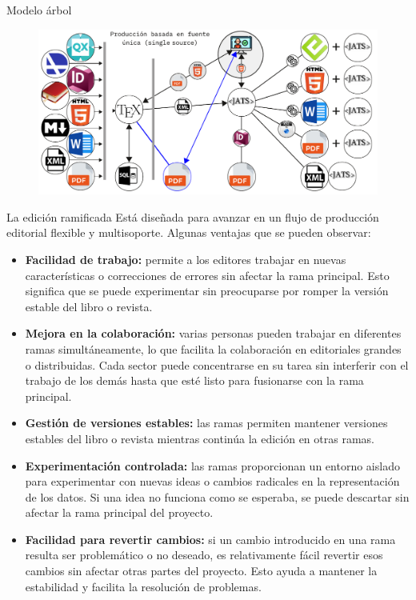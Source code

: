 \documentclass[14pt,aspectratio=169]{beamer}
\begin{document}
\begin{frame}{Modelo árbol}
	\begin{figure}
		\centering
		\includegraphics[width=.9\textwidth]{arbol3.pdf}
	\end{figure}
\end{frame}

\begin{frame}[allowframebreaks]{La edición ramificada}
Está diseñada para avanzar en un flujo de producción editorial flexible y multisoporte. Algunas ventajas que se pueden observar:

\begin{itemize}
\item \textbf{Facilidad de trabajo:} permite a los editores trabajar en nuevas características o correcciones de errores sin afectar la rama principal. Esto significa que se puede experimentar sin preocuparse por romper la versión estable del libro o revista.
\item \textbf{Mejora en la colaboración:} varias personas pueden trabajar en diferentes ramas simultáneamente, lo que facilita la colaboración en editoriales grandes o distribuidas. Cada sector puede concentrarse en su tarea sin interferir con el trabajo de los demás hasta que esté listo para fusionarse con la rama principal.
\item \textbf{Gestión de versiones estables:} las ramas permiten mantener versiones estables del libro o revista mientras continúa la edición en otras ramas.
\item \textbf{Experimentación controlada:} las ramas proporcionan un entorno aislado para experimentar con nuevas ideas o cambios radicales en la representación de los datos. Si una idea no funciona como se esperaba, se puede descartar sin afectar la rama principal del proyecto.
\item \textbf{Facilidad para revertir cambios:} si un cambio introducido en una rama resulta ser problemático o no deseado, es relativamente fácil revertir esos cambios sin afectar otras partes del proyecto. Esto ayuda a mantener la estabilidad y facilita la resolución de problemas.
\end{itemize}
\end{frame}
\end{document}
